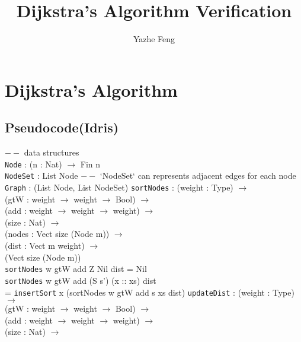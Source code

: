 \documentclass[11pt, oneside]{article}   	%
\title{Dijkstra's Algorithm Verification}
\author{Yazhe Feng}
\newcommand\tab[1][1cm]{\hspace*{#1}}
\begin{document}
\maketitle

\section{Dijkstra's Algorithm}

\subsection{Pseudocode(Idris)}

$--$ data structures
\\
\texttt{Node} : (n : Nat) $\rightarrow$ Fin n
\\
\texttt{NodeSet} : List Node \tab $--$ `NodeSet` can represents adjacent edges for each node
\\
\texttt{Graph} : (List Node, List NodeSet)
\newline\newline 
\texttt{sortNodes} : (weight : Type) $\rightarrow$ \\
             (gtW : weight $\rightarrow$ weight $\rightarrow$ Bool) $\rightarrow$ \\
             (add : weight $\rightarrow$ weight $\rightarrow$ weight) $\rightarrow$ \\
             (size : Nat) $\rightarrow$ \\
             (nodes : Vect size (Node m)) $\rightarrow$ \\
             (dist : Vect m weight) $\rightarrow$ \\
             (Vect size (Node m))\\
\texttt{sortNodes} w gtW add Z Nil dist = Nil\\
\texttt{sortNodes} w gtW add (S s') (x :: xs) dist \\ 
\tab = \texttt{insertSort} x (sortNodes w gtW add s
 xs dist)
 \newline\newline
\texttt{updateDist} : (weight : Type) $\rightarrow$ \\
            \tab\tab  (gtW : weight $\rightarrow$ weight $\rightarrow$ Bool) $\rightarrow$ \\
            \tab\tab  (add : weight $\rightarrow$ weight $\rightarrow$ weight) $\rightarrow$ \\
            \tab\tab  (size : Nat) $\rightarrow$ \\
\end{document}
